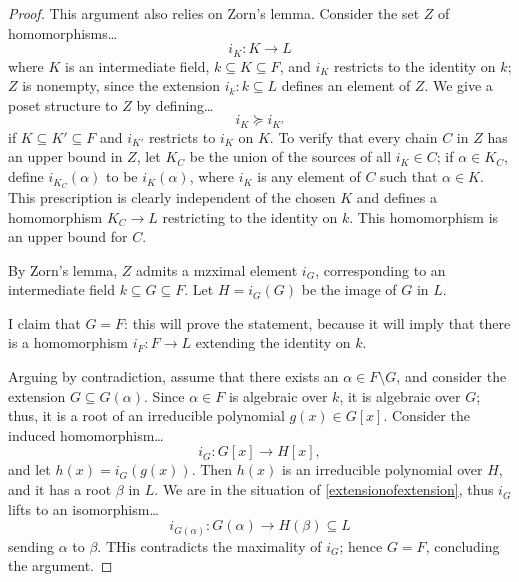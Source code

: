 \begin{proof}
This argument also relies on Zorn's lemma. Consider the set $Z$ of homomorphisms\dots
$$i_K : K \rightarrow L$$
where $K$ is an intermediate field, $k \subseteq K \subseteq F$, and $i_K$ restricts to the identity on $k$;
$Z$ is nonempty, since the extension $i_k : k \subseteq L$ defines an element of $Z$. We give a poset structure to $Z$
by defining\dots
$$i_K \succeq i_{K'}$$
if $K \subseteq K' \subseteq F$ and $i_{K'}$ restricts to $i_K$ on $K$. To verify that every chain $C$ in $Z$ has an upper bound in $Z$,
let $K_C$ be the union of the sources of all $i_K \in C$; if $\alpha \in K_C$, define $i_{K_C}(\alpha)$ to be $i_K(\alpha)$, where $i_K$ is any
element of $C$ such that $\alpha \in K$. This prescription is clearly independent of the chosen $K$ and defines a homomorphism $K_C \rightarrow L$
restricting to the identity on $k$. This homomorphism is an upper bound for $C$.

By Zorn's lemma, $Z$ admits a mzximal element $i_G$, corresponding to an intermediate field $k \subseteq G \subseteq F$. Let $H = i_G(G)$ be the image
of $G$ in $L$.

I claim that $G = F$: this will prove the statement, because it will imply that there is a homomorphism $i_F : F \rightarrow L$ extending the identity on $k$.

Arguing by contradiction, assume that there exists an $\alpha \in F \setminus G$, and consider the extension $G \subseteq G(\alpha)$. Since $\alpha \in F$ is
algebraic over $k$, it is algebraic over $G$; thus, it is a root of an irreducible polynomial $g(x) \in G[x]$. Consider the induced homomorphism\dots
$$i_G : G[x] \rightarrow H[x],$$
and let $h(x) = i_G(g(x))$. Then $h(x)$ is an irreducible polynomial over $H$, and it has a root $\beta$ in $L$. We are in the situation of \ref{extensionofextension},
thus $i_G$ lifts to an isomorphism\dots
$$i_{G(\alpha)} : G(\alpha) \rightarrow H(\beta) \subseteq L$$
sending $\alpha$ to $\beta$. THis contradicts the maximality of $i_G$; hence $G = F$, concluding the argument.
\end{proof}